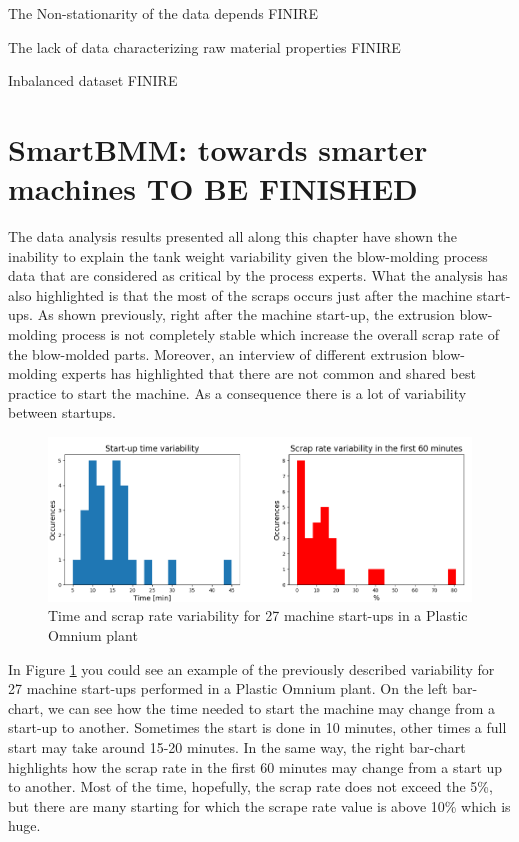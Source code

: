The Non-stationarity of the data depends FINIRE

The lack of data characterizing raw material properties FINIRE

Inbalanced dataset FINIRE



\section{SmartBMM: towards smarter machines TO BE FINISHED}

The data analysis results presented all along this chapter have shown the inability to explain the tank weight variability given the blow-molding process data that are considered as critical by the process experts. What the analysis has also highlighted is that the most of the scraps occurs just after the machine start-ups. As shown previously, right after the machine start-up, the extrusion blow-molding process is not completely stable which increase the overall scrap rate of the blow-molded parts. Moreover, an interview of different extrusion blow-molding experts has highlighted that there are not common and shared best practice to start the machine. As a consequence there is a lot of variability between startups.

\begin{figure}
\centerline{\includegraphics[scale=0.7]{images/chapter_3/smartbmm_barchart.png}}
\caption{Time and scrap rate variability for 27 machine start-ups in a Plastic Omnium plant}
\label{fig:smartbmm_barchart}
\end{figure}

In Figure \ref{fig:smartbmm_barchart} you could see an example of the previously described variability for 27 machine start-ups performed in a Plastic Omnium plant. On the left bar-chart, we can see how the time needed to start the machine may change from a start-up to another. Sometimes the start is done in 10 minutes, other times a full start may take around 15-20 minutes. In the same way, the right bar-chart highlights how the scrap rate in the first 60 minutes may change from a start up to another. Most of the time, hopefully, the scrap rate does not exceed the 5\%, but there are many starting for which the scrape rate value is above 10\% which is huge. 

